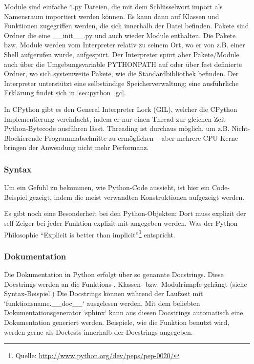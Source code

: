 Module sind einfache *.py Dateien, die mit dem Schlüsselwort import als
Namensraum importiert werden können. Es kann dann auf Klassen und Funktionen
zugegriffen werden, die sich innerhalb der Datei befinden. Pakete sind
Ordner die eine \_\_init\_\_.py und auch wieder Module enthalten. Die Pakete
bzw. Module werden vom Interpreter relativ zu seinem Ort, wo er von z.B. einer
Shell aufgerufen wurde, aufgespürt. Der Interpreter spürt aber Pakete/Module
auch über die Umgebungsvariable PYTHONPATH auf oder über fest definierte
Ordner, wo sich systemweite Pakete, wie die Standardbibliothek befinden.
Der Interpreter unterstützt eine selbständige Speicherverwaltung; eine
ausführliche Erklärung findet sich in \ref{sec:python_gc}.

In CPython gibt es den General Interpreter Lock (GIL), welcher die CPython
Implementierung vereinfacht, indem er nur einen Thread zur gleichen Zeit
Python-Bytecode ausführen lässt. Threading ist durchaus möglich, um z.B.
Nicht-Blockierende Programmabschnitte zu ermöglichen -- aber mehrere CPU-Kerne
bringen der Anwendung nicht mehr Performanz.\cite{pyref-reference}


\subsubsection{Syntax}


Um ein Gefühl zu bekommen, wie Python-Code aussieht, ist hier ein Code-Beispiel
gezeigt, indem die meist verwandten Konstruktionen aufgezeigt werden.





Es gibt noch eine Besonderheit bei den Python-Objekten: Dort muss explizit der
self-Zeiger bei jeder Funktion explizit mit angegeben werden. Was der Python
Philosophie  “Explicit is better than implicit”\footnote{Quelle: \url{http://www.python.org/dev/peps/pep-0020/}} entspricht.


\subsubsection{Dokumentation}


Die Dokumentation in Python erfolgt über so genannte Docstrings. Diese
Docstrings werden an die Funktions-, Klassen- bzw. Modulrümpfe gehängt
(siehe Syntax-Beispiel.) Die Docstrings können während der Laufzeit mit
`funktionsname.\_\_doc\_\_` ausgelesen werden. Mit dem beliebten
Dokumentationsgenerator `sphinx` kann aus diesen Docstrings automatisch
eine Dokumentation generiert werden.
Beispiele, wie die Funktion benutzt wird, werden gerne als Doctests innerhalb
der Docstrings angegeben.


